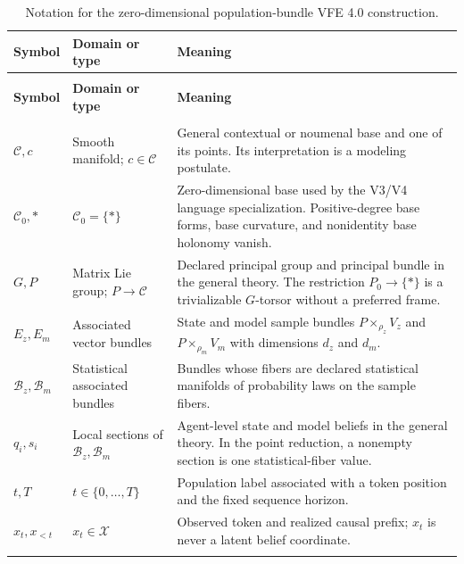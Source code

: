 {\small
\begin{longtable}{>{\raggedright\arraybackslash}p{} >{\raggedright\arraybackslash}p{} >{\raggedright\arraybackslash}p{}}
\caption{Notation for the zero-dimensional population-bundle VFE 4.0 construction.}
\label{tab:vfe4-notation}\\
\toprule
\textbf{Symbol} & \textbf{Domain or type} & \textbf{Meaning} \\
\midrule
\endfirsthead
\multicolumn{3}{c}{\tablename\ \thetable\ continued}\\
\toprule
\textbf{Symbol} & \textbf{Domain or type} & \textbf{Meaning} \\
\midrule
\endhead
\midrule
\multicolumn{3}{r}{Continued on the next page}\\
\endfoot
\bottomrule
\endlastfoot
$\mathcal C,c$ & Smooth manifold; $c\in\mathcal C$ & General contextual or noumenal base and one of its points. Its interpretation is a modeling postulate. \\
\addlinespace
$\mathcal C_0,\ast$ & $\mathcal C_0=\{\ast\}$ & Zero-dimensional base used by the V3/V4 language specialization. Positive-degree base forms, base curvature, and nonidentity base holonomy vanish. \\
\addlinespace
$G,P$ & Matrix Lie group; $P\to\mathcal C$ & Declared principal group and principal bundle in the general theory. The restriction $P_0\to\{\ast\}$ is a trivializable $G$-torsor without a preferred frame. \\
\addlinespace
$E_z,E_m$ & Associated vector bundles & State and model sample bundles $P\times_{\rho_z}V_z$ and $P\times_{\rho_m}V_m$ with dimensions $d_z$ and $d_m$. \\
\addlinespace
$\mathscr B_z,\mathscr B_m$ & Statistical associated bundles & Bundles whose fibers are declared statistical manifolds of probability laws on the sample fibers. \\
\addlinespace
$q_i,s_i$ & Local sections of $\mathscr B_z,\mathscr B_m$ & Agent-level state and model beliefs in the general theory. In the point reduction, a nonempty section is one statistical-fiber value. \\
\addlinespace
$t,T$ & $t\in\{0,\ldots,T\}$ & Population label associated with a token position and the fixed sequence horizon. \\
\addlinespace
$x_t,x_{<t}$ & $x_t\in\mathcal X$ & Observed token and realized causal prefix; $x_t$ is never a latent belief coordinate. \\
\addlinespace

\end{longtable}}
